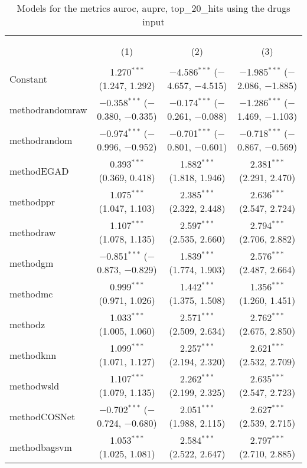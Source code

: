 
\begin{table}[!htbp] \centering 
  \caption{Models for the metrics auroc, auprc, top_20_hits using the drugs input} 
  \label{} 
\begin{tabular}{@{\extracolsep{5pt}}lccc} 
\\[-1.8ex]\hline 
\hline \\[-1.8ex] 
\\[-1.8ex] & (1) & (2) & (3)\\ 
\hline \\[-1.8ex] 
 Constant & 1.270$^{***}$ (1.247, 1.292) & $-$4.586$^{***}$ ($-$4.657, $-$4.515) & $-$1.985$^{***}$ ($-$2.086, $-$1.885) \\ 
  methodrandomraw & $-$0.358$^{***}$ ($-$0.380, $-$0.335) & $-$0.174$^{***}$ ($-$0.261, $-$0.088) & $-$1.286$^{***}$ ($-$1.469, $-$1.103) \\ 
  methodrandom & $-$0.974$^{***}$ ($-$0.996, $-$0.952) & $-$0.701$^{***}$ ($-$0.801, $-$0.601) & $-$0.718$^{***}$ ($-$0.867, $-$0.569) \\ 
  methodEGAD & 0.393$^{***}$ (0.369, 0.418) & 1.882$^{***}$ (1.818, 1.946) & 2.381$^{***}$ (2.291, 2.470) \\ 
  methodppr & 1.075$^{***}$ (1.047, 1.103) & 2.385$^{***}$ (2.322, 2.448) & 2.636$^{***}$ (2.547, 2.724) \\ 
  methodraw & 1.107$^{***}$ (1.078, 1.135) & 2.597$^{***}$ (2.535, 2.660) & 2.794$^{***}$ (2.706, 2.882) \\ 
  methodgm & $-$0.851$^{***}$ ($-$0.873, $-$0.829) & 1.839$^{***}$ (1.774, 1.903) & 2.576$^{***}$ (2.487, 2.664) \\ 
  methodmc & 0.999$^{***}$ (0.971, 1.026) & 1.442$^{***}$ (1.375, 1.508) & 1.356$^{***}$ (1.260, 1.451) \\ 
  methodz & 1.033$^{***}$ (1.005, 1.060) & 2.571$^{***}$ (2.509, 2.634) & 2.762$^{***}$ (2.675, 2.850) \\ 
  methodknn & 1.099$^{***}$ (1.071, 1.127) & 2.257$^{***}$ (2.194, 2.320) & 2.621$^{***}$ (2.532, 2.709) \\ 
  methodwsld & 1.107$^{***}$ (1.079, 1.135) & 2.262$^{***}$ (2.199, 2.325) & 2.635$^{***}$ (2.547, 2.723) \\ 
  methodCOSNet & $-$0.702$^{***}$ ($-$0.724, $-$0.680) & 2.051$^{***}$ (1.988, 2.115) & 2.627$^{***}$ (2.539, 2.715) \\ 
  methodbagsvm & 1.053$^{***}$ (1.025, 1.081) & 2.584$^{***}$ (2.522, 2.647) & 2.797$^{***}$ (2.710, 2.885) \\ 

\end{tabular}
\end{table}
